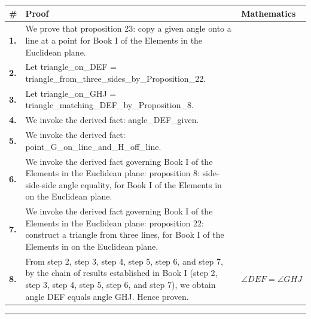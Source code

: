 \documentclass[11pt]{article}
\theoremstyle{definition}
\begin{document}
\begin{tabular}{@{} >{\raggedright\arraybackslash}p{} >{\raggedright\arraybackslash}p{} >{\raggedleft\arraybackslash}p{} @{}}
\textbf{\#} & \textbf{Proof} & \textbf{Mathematics} \\
\midrule
\textbf{1.} & We prove that proposition 23: copy a given angle onto a line at a point for Book I of the Elements in the Euclidean plane. & \\[0.45em]
\textbf{2.} & Let triangle\_on\_DEF = triangle\_from\_three\_sides\_by\_Proposition\_22. & \\[0.45em]
\textbf{3.} & Let triangle\_on\_GHJ = triangle\_matching\_DEF\_by\_Proposition\_8. & \\[0.45em]
\textbf{4.} & We invoke the derived fact: angle\_DEF\_given. & \\[0.45em]
\textbf{5.} & We invoke the derived fact: point\_G\_on\_line\_and\_H\_off\_line. & \\[0.45em]
\textbf{6.} & We invoke the derived fact governing Book I of the Elements in the Euclidean plane: proposition 8: side-side-side angle equality, for Book I of the Elements in on the Euclidean plane. & \\[0.45em]
\textbf{7.} & We invoke the derived fact governing Book I of the Elements in the Euclidean plane: proposition 22: construct a triangle from three lines, for Book I of the Elements in on the Euclidean plane. & \\[0.45em]
\textbf{8.} & From step 2, step 3, step 4, step 5, step 6, and step 7, by the chain of results established in Book I (step 2, step 3, step 4, step 5, step 6, and step 7), we obtain angle DEF equals angle GHJ. Hence proven. & $\displaystyle \angle DEF = \angle GHJ$ \\[0.45em]
\bottomrule
\end{tabular}
\label{thm:Geometry-Euclid Book I-proposition_23_copy_a_given_angle_onto_a_line_at_a_point}
\par\medskip\hrule
\end{document}
